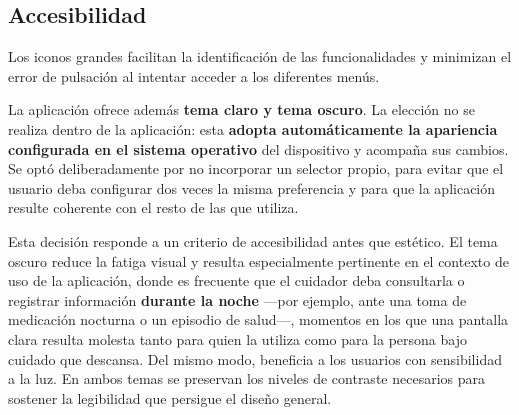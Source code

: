\documentclass[a4paper,12pt]{article}
\begin{document}
    \subsection{Accesibilidad}
    \par Los iconos grandes facilitan la identificación de las funcionalidades y minimizan el error de pulsación al intentar acceder a los diferentes menús.
    \par La aplicación ofrece además \textbf{tema claro y tema oscuro}. La elección no se realiza dentro de la aplicación: esta \textbf{adopta automáticamente la apariencia configurada en el sistema operativo} del dispositivo y acompaña sus cambios. Se optó deliberadamente por no incorporar un selector propio, para evitar que el usuario deba configurar dos veces la misma preferencia y para que la aplicación resulte coherente con el resto de las que utiliza.
    \par Esta decisión responde a un criterio de accesibilidad antes que estético. El tema oscuro reduce la fatiga visual y resulta especialmente pertinente en el contexto de uso de la aplicación, donde es frecuente que el cuidador deba consultarla o registrar información \textbf{durante la noche} —por ejemplo, ante una toma de medicación nocturna o un episodio de salud—, momentos en los que una pantalla clara resulta molesta tanto para quien la utiliza como para la persona bajo cuidado que descansa. Del mismo modo, beneficia a los usuarios con sensibilidad a la luz. En ambos temas se preservan los niveles de contraste necesarios para sostener la legibilidad que persigue el diseño general.
\end{document}
